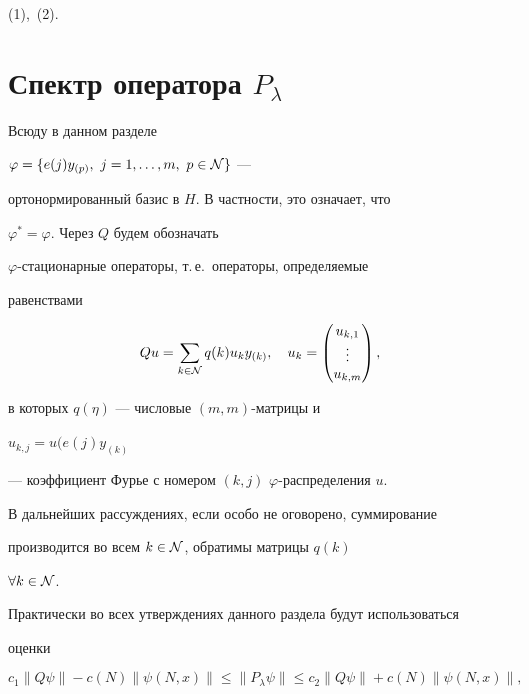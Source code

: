 (1),~(2). 


 


\section{Спектр оператора $P_\lambda$} 


 


Всюду в данном разделе 


$\varphi=\{e(j)y_{(p)},\ j=1,\dotsc,m,\ p\in\cal N\}$ --- 


ортонормированный базис в $H$. В частности, это означает, что 


$\varphi^*=\varphi$. Через $Q$ будем обозначать 


$\varphi$-стационарные операторы, т.\,е.~операторы, определяемые 


равенствами 


$$ 


Q u=\sum_{k\in\cal N}q(k)u_k y_{(k)},\quad u_k =


\begin{pmatrix} 


u_{k,1} \\ \vdots \\ u_{k,m} 


\end{pmatrix} 


, 


$$ 


в которых $q(\eta)$ --- числовые $(m,m)$-матрицы и 


$u_{k,j}=u(e(j)y_{(k)}$ 


--- коэффициент Фурье с номером $(k,j)$\; $\varphi$-распределения $u$. 


 


В дальнейших рассуждениях, если особо не оговорено, суммирование 


производится во всем $k\in\cal N$, обратимы матрицы $q(k)$ 


$\forall k\in\cal N$. 


 


Практически во всех утверждениях данного раздела будут использоваться 


оценки 


\begin{equation} 


c_1\|Q\psi\|-c(N)\|\psi(N,x)\|\le 


\|P_\lambda\psi\|\le c_2\|Q\psi\|+c(N)\|\psi(N,x)\|, 


\end{equation} 


